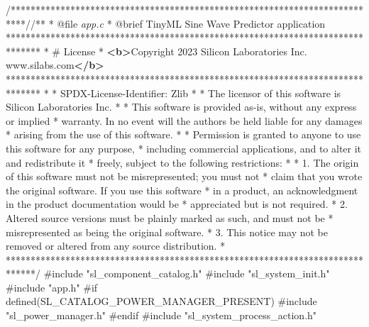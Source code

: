 \documentclass[
  9pt,
  letterpaper,
  abstract,
  titlepage]{scrbook}
\newenvironment{Shaded}{\begin{snugshade}}{\end{snugshade}}
\newcommand{\AnnotationTok}[1]{\textcolor[rgb]{0.37,0.37,0.37}{#1}}
\newcommand{\CommentTok}[1]{\textcolor[rgb]{0.37,0.37,0.37}{#1}}
\newcommand{\CommentVarTok}[1]{\textcolor[rgb]{0.37,0.37,0.37}{\textit{#1}}}
\newcommand{\ImportTok}[1]{\textcolor[rgb]{0.00,0.46,0.62}{#1}}
\newcommand{\KeywordTok}[1]{\textcolor[rgb]{0.00,0.23,0.31}{\textbf{#1}}}
\newcommand{\PreprocessorTok}[1]{\textcolor[rgb]{0.68,0.00,0.00}{#1}}
\begin{document}
\begin{Shaded}
\begin{Highlighting}[]
\CommentTok{/***************************************************************************//**}
\CommentTok{ * }\AnnotationTok{@file}\CommentTok{ }\CommentVarTok{app.c}
\CommentTok{ * }\AnnotationTok{@brief}\CommentTok{ TinyML Sine Wave Predictor application}
\CommentTok{ *******************************************************************************}
\CommentTok{ * \# License}
\CommentTok{ * }\KeywordTok{\textless{}b\textgreater{}}\CommentTok{Copyright 2023 Silicon Laboratories Inc. www.silabs.com}\KeywordTok{\textless{}/b\textgreater{}}
\CommentTok{ *******************************************************************************}
\CommentTok{ *}
\CommentTok{ * }\AnnotationTok{SPDX{-}License{-}Identifier:}\CommentTok{ Zlib}
\CommentTok{ *}
\CommentTok{ * The licensor of this software is Silicon Laboratories Inc.}
\CommentTok{ *}
\CommentTok{ * This software is provided \textquotesingle{}as{-}is\textquotesingle{}, without any express or implied}
\CommentTok{ * warranty. In no event will the authors be held liable for any damages}
\CommentTok{ * arising from the use of this software.}
\CommentTok{ *}
\CommentTok{ * Permission is granted to anyone to use this software for any purpose,}
\CommentTok{ * including commercial applications, and to alter it and redistribute it}
\CommentTok{ * freely, subject to the following restrictions:}
\CommentTok{ *}
\CommentTok{ * 1. The origin of this software must not be misrepresented; you must not}
\CommentTok{ *    claim that you wrote the original software. If you use this software}
\CommentTok{ *    in a product, an acknowledgment in the product documentation would be}
\CommentTok{ *    appreciated but is not required.}
\CommentTok{ * 2. Altered source versions must be plainly marked as such, and must not be}
\CommentTok{ *    misrepresented as being the original software.}
\CommentTok{ * 3. This notice may not be removed or altered from any source distribution.}
\CommentTok{ *}
\CommentTok{ ******************************************************************************/}
\PreprocessorTok{\#include }\ImportTok{"sl\_component\_catalog.h"}
\PreprocessorTok{\#include }\ImportTok{"sl\_system\_init.h"}
\PreprocessorTok{\#include }\ImportTok{"app.h"}
\PreprocessorTok{\#if defined(SL\_CATALOG\_POWER\_MANAGER\_PRESENT)}
\PreprocessorTok{\#include }\ImportTok{"sl\_power\_manager.h"}
\PreprocessorTok{\#endif}
\PreprocessorTok{\#include }\ImportTok{"sl\_system\_process\_action.h"}


\end{Highlighting}
\end{Shaded}
\end{document}
